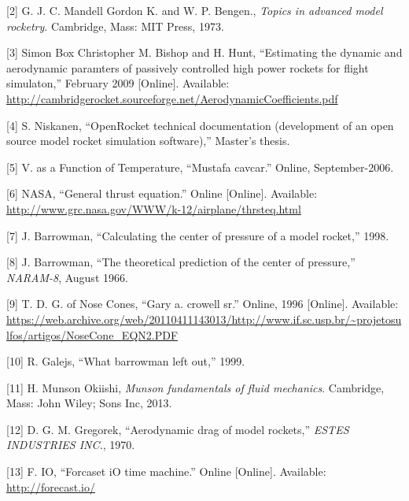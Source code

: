 \documentclass[]{book}
\begin{document}
{[}2{]} G. J. C. Mandell Gordon K. and W. P. Bengen., \emph{Topics in
advanced model rocketry}. Cambridge, Mass: MIT Press, 1973.

{[}3{]} Simon Box Christopher M. Bishop and H. Hunt, ``Estimating the
dynamic and aerodynamic paramters of passively controlled high power
rockets for flight simulaton,'' February 2009 {[}Online{]}. Available:
\url{http://cambridgerocket.sourceforge.net/AerodynamicCoefficients.pdf}

{[}4{]} S. Niskanen, ``OpenRocket technical documentation (development
of an open source model rocket simulation software),'' Master's thesis.

{[}5{]} V. as a Function of Temperature, ``Mustafa cavcar.'' Online,
September-2006.

{[}6{]} NASA, ``General thrust equation.'' Online {[}Online{]}.
Available: \url{http://www.grc.nasa.gov/WWW/k-12/airplane/thrsteq.html}

{[}7{]} J. Barrowman, ``Calculating the center of pressure of a model
rocket,'' 1998.

{[}8{]} J. Barrowman, ``The theoretical prediction of the center of
pressure,'' \emph{NARAM-8}, August 1966.

{[}9{]} T. D. G. of Nose Cones, ``Gary a. crowell sr.'' Online, 1996
{[}Online{]}. Available:
\url{https://web.archive.org/web/20110411143013/http://www.if.sc.usp.br/~projetosulfos/artigos/NoseCone_EQN2.PDF}

{[}10{]} R. Galejs, ``What barrowman left out,'' 1999.

{[}11{]} H. Munson Okiishi, \emph{Munson fundamentals of fluid
mechanics}. Cambridge, Mass: John Wiley; Sons Inc, 2013.

{[}12{]} D. G. M. Gregorek, ``Aerodynamic drag of model rockets,''
\emph{ESTES INDUSTRIES INC.}, 1970.

{[}13{]} F. IO, ``Forcaset iO time machine.'' Online {[}Online{]}.
Available: \url{http://forecast.io/}
\end{document}
